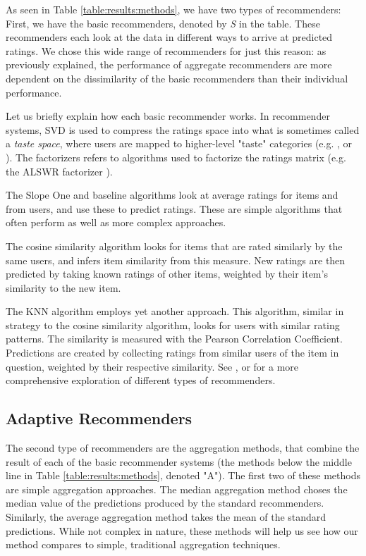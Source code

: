 As seen in Table \ref{table:results:methods}, we have two types of recommenders:
First, we have the basic recommenders, denoted by \emph{S} in the table.
These recommenders each look at the data in different ways to arrive at predicted ratings.
We chose this wide range of recommenders for just this reason:
as previously explained, the performance of aggregate recommenders
are more dependent on the dissimilarity of the basic recommenders
than their individual performance.

Let us briefly explain how each basic recommender works.
In recommender systems, SVD is used to compress the ratings space into what is sometimes called a \emph{taste space},
where users are mapped to higher-level "taste" categories
(e.g. \cite[p5]{Ahn2004}, \cite[p4]{Brand2003} or \cite[p2]{Liu2006}).
The factorizers refers to algorithms used to factorize the ratings matrix
(e.g. the ALSWR factorizer \cite{Zhou2008}).

The Slope One and baseline algorithms look at average
ratings for items and from users, and use these to predict ratings.
These are simple algorithms that often perform as well
as more complex approaches.

The cosine similarity algorithm looks for items that are rated
similarly by the same users, and infers item similarity from this measure.
New ratings are then predicted by taking known ratings of other items,
weighted by their item's similarity to the new item.

The KNN algorithm employs yet another approach. This algorithm,
similar in strategy to the cosine similarity algorithm,
looks for users with similar rating patterns.
The similarity is measured with the Pearson Correlation Coefficient.
Predictions are created by collecting ratings from similar users
of the item in question, weighted by their respective similarity.
See \cite{Adomavicius2005}, \cite{Pazzani2007} or \cite{Schafer2007}
for a more comprehensive exploration of different types of recommenders.


\subsection{Adaptive Recommenders}

The second type of recommenders are the aggregation methods, 
that combine the result of each of the basic recommender systems
(the methods below the middle line in Table \ref{table:results:methods},
denoted "A").
The first two of these methods are simple aggregation approaches.
The median aggregation method choses the median value of the predictions
produced by the standard recommenders.
Similarly, the average aggregation method takes the mean of the
standard predictions.
While not complex in nature, these methods
will help us see how our method compares to simple, traditional
aggregation techniques.

